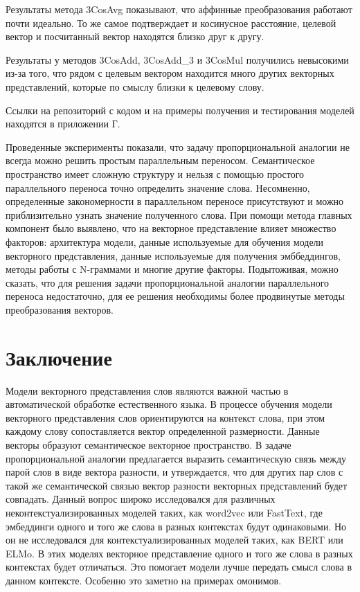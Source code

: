 \documentclass[a4paper,14pt]{article}
\begin{document}
Результаты метода 3CosAvg показывают, что аффинные преобразования работают почти идеально.
То же самое подтверждает и косинусное расстояние, целевой вектор и посчитанный вектор находятся близко друг к другу.

Результаты у методов 3CosAdd, 3CosAdd\_3 и 3CosMul получились невысокими из-за того, что рядом с целевым вектором находится много других векторных представлений, которые по смыслу близки к целевому слову.

Ссылки на репозиторий с кодом и на примеры получения и тестирования моделей находятся в приложении Г.

Проведенные эксперименты показали, что задачу пропорциональной аналогии не всегда можно решить простым параллельным переносом.
Семантическое пространство имеет сложную структуру и нельзя с помощью простого параллельного переноса точно определить значение слова.
Несомненно, определенные закономерности в параллельном переносе присутствуют и можно приблизительно узнать значение полученного слова.
При помощи метода главных компонент было выявлено, что на векторное представление влияет множество факторов: архитектура модели, данные используемые для обучения модели векторного представления, данные используемые для получения эмббеддингов, методы работы с N-граммами и многие другие факторы.
Подытоживая, можно сказать, что для решения задачи пропорциональной аналогии параллельного переноса недостаточно, для ее решения необходимы более продвинутые методы преобразования векторов. 



%

\newpage
\section{Заключение}

Модели векторного представления слов являются важной частью в автоматической обработке естественного языка.
В процессе обучения модели векторного представления слов ориентируются на контекст слова, при этом каждому слову сопоставляется вектор определенной размерности.
Данные векторы образуют семантическое векторное пространство.
В задаче пропорциональной аналогии предлагается выразить семантическую связь между парой слов в виде вектора разности, и утверждается, что для других пар слов с такой же семантической связью вектор разности векторных представлений будет совпадать.
Данный вопрос широко исследовался для различных неконтекстуализированных моделей таких, как word2vec или FastText, где эмбеддинги одного и того же слова в разных контекстах будут одинаковыми.
Но он не исследовался для контекстуализированных моделей таких, как BERT или ELMo.
В этих моделях векторное представление одного и того же слова в разных контекстах будет отличаться.
Это помогает модели лучше передать смысл слова в данном контексте.
Особенно это заметно на примерах омонимов.
\end{document}
